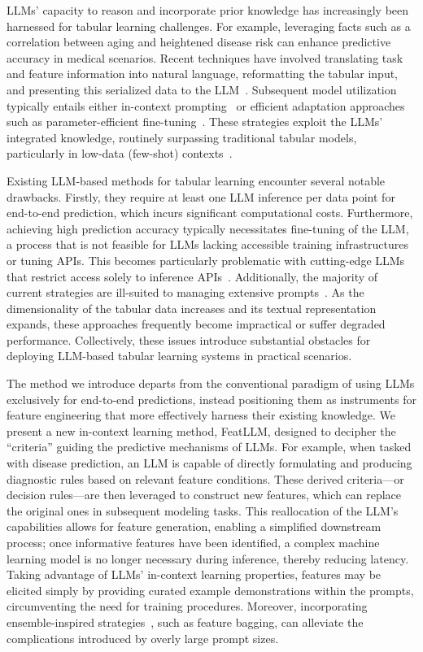 LLMs' capacity to reason and incorporate prior knowledge has increasingly been harnessed for tabular learning challenges. For example, leveraging facts such as a correlation between aging and heightened disease risk can enhance predictive accuracy in medical scenarios. Recent techniques have involved translating task and feature information into natural language, reformatting the tabular input, and presenting this serialized data to the LLM~\cite{dinh2022lift,wang2023anypredict}. Subsequent model utilization typically entails either in-context prompting~\cite{nam2023semi} or efficient adaptation approaches such as parameter-efficient fine-tuning~\cite{dinh2022lift,hegselmann2023tabllm}. These strategies exploit the LLMs’ integrated knowledge, routinely surpassing traditional tabular models, particularly in low-data (few-shot) contexts~\cite{hegselmann2023tabllm}.

Existing LLM-based methods for tabular learning encounter several notable drawbacks. Firstly, they require at least one LLM inference per data point for end-to-end prediction, which incurs significant computational costs. Furthermore, achieving high prediction accuracy typically necessitates fine-tuning of the LLM, a process that is not feasible for LLMs lacking accessible training infrastructures or tuning APIs. This becomes particularly problematic with cutting-edge LLMs that restrict access solely to inference APIs~\cite{anil2023palm,openai2023gpt4}. Additionally, the majority of current strategies are ill-suited to managing extensive prompts~\cite{liu2023lost}. As the dimensionality of the tabular data increases and its textual representation expands, these approaches frequently become impractical or suffer degraded performance. Collectively, these issues introduce substantial obstacles for deploying LLM-based tabular learning systems in practical scenarios.

The method we introduce departs from the conventional paradigm of using LLMs exclusively for end-to-end predictions, instead positioning them as instruments for feature engineering that more effectively harness their existing knowledge. We present a new in-context learning method, \textsf{FeatLLM}, designed to decipher the “criteria” guiding the predictive mechanisms of LLMs. For example, when tasked with disease prediction, an LLM is capable of directly formulating and producing diagnostic rules based on relevant feature conditions. These derived criteria—or decision rules—are then leveraged to construct new features, which can replace the original ones in subsequent modeling tasks. This reallocation of the LLM’s capabilities allows for feature generation, enabling a simplified downstream process; once informative features have been identified, a complex machine learning model is no longer necessary during inference, thereby reducing latency. Taking advantage of LLMs' in-context learning properties, features may be elicited simply by providing curated example demonstrations within the prompts, circumventing the need for training procedures. Moreover, incorporating ensemble-inspired strategies~\cite{breiman2001random}, such as feature bagging, can alleviate the complications introduced by overly large prompt sizes.

